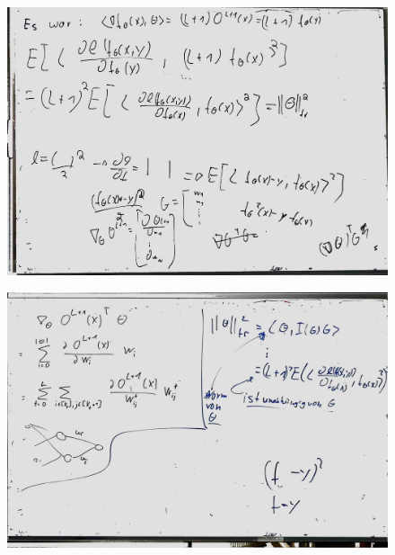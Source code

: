 \documentclass[a4paper]{article}
\begin{document}
\begin{figure}
	\centering
\includegraphics[width=\textwidth]{whiteboard_notes/07.jpg}
\end{figure}
\begin{figure}
	\centering
\includegraphics[width=\textwidth]{whiteboard_notes/08.jpg}
\end{figure}






\end{document}
